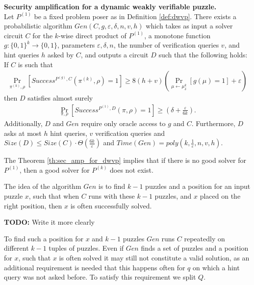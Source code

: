 \begin{theorem}{\textbf{Security amplification for a dynamic weakly verifiable puzzle.}}
\label{th:sec_amp_for_dwvp}\\
Let $P^{(1)}$ be a fixed problem poser as in Definition \ref{def:dwvp}. There exists a probabilistic
algorithm $Gen(C, g, \varepsilon, \delta, n, v, h)$ which takes as input a solver circuit $C$ for the $k$-wise
direct product of $P^{(1)}$, a monotone function $g:\{0,1\}^k \rightarrow \{0,1\}$, parameters $\varepsilon, \delta,n$,
the number of verification queries $v$, and hint queries $h$ asked by $C$, and outputs a circuit $D$
such that the following holds: \\
If $C$ is such that \\
  \begin{align*}
    \underset{\pi^{(k)}, \rho}{\Pr}[Success^{P^{(g)}, C}(\pi^{(k)}, \rho) = 1] \geq 8(h+v) \left(\underset{\mu \leftarrow \mu_\delta^k}{\Pr}[g(\mu) = 1] + \varepsilon\right)
  \end{align*}
then $D$ satisfies almost surely
  \begin{align*}
    \underset{\pi, \rho}{\Pr}[Success^{P^{(1)},D}(\pi, \rho) = 1] \geq (\delta + \frac{\varepsilon}{6k}).
  \end{align*}
Additionally, $D$ and $Gen$ require only oracle access to $g$ and $C$. Furthermore, $D$ asks at most $h$ hint queries, $v$ verification queries and
$Size(D) \leq Size(C) \cdot \Theta(\frac{6k}{\varepsilon})$ and $Time(Gen) = poly(k, \frac{1}{\varepsilon}, n, v, h)$.
\end{theorem}
%
%
The Theorem \ref{th:sec_amp_for_dwvp} implies that if there is no good solver for $P^{(1)}$, then a good solver for $P^{(k)}$ does not exist.

The idea of the algorithm $Gen$ is to find $k-1$ puzzles and a position for an input puzzle $x$, such that
when $C$ runs with these $k-1$ puzzles, and $x$ placed on the right position, then $x$ is often successfully solved.
\begin{todo}
  \textbf{TODO:} Write it more clearly
\end{todo}
To find such a position for $x$ and $k-1$ puzzles $Gen$ runs $C$ repeatedly on different $k-1$ tuples of puzzles.
Even if $Gen$ finds a set of puzzles and a position for $x$, such that $x$ is often solved it may still not
constitute a valid solution, as an additional requirement is needed that this happens often for $q$
on which a hint query was not asked before. To satisfy this requirement we split $Q$.

